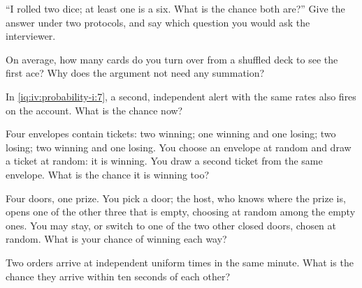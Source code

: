\begin{interviewq}\label{iq:iv:probability-i:8}
``I rolled two dice; at least one is a six. What is the chance both are?'' Give the answer under two protocols,
and say which question you would ask the interviewer.
\end{interviewq}

\begin{interviewq}\label{iq:iv:probability-i:9}
On average, how many cards do you turn over from a shuffled deck to see the first ace? Why does the argument
not need any summation?
\end{interviewq}

\begin{interviewq}\label{iq:iv:probability-i:10}
In \cref{iq:iv:probability-i:7}, a second, independent alert with the same rates also fires on the account.
What is the chance now?
\end{interviewq}

\begin{interviewq}\label{iq:iv:probability-i:11}
Four envelopes contain tickets: two winning; one winning and one losing; two losing; two winning and one losing.
You choose an envelope at random and draw a ticket at random: it is winning. You draw a second ticket from the
same envelope. What is the chance it is winning too?
\end{interviewq}

\begin{interviewq}\label{iq:iv:probability-i:12}
Four doors, one prize. You pick a door; the host, who knows where the prize is, opens one of the other three
that is empty, choosing at random among the empty ones. You may stay, or switch to one of the two other closed
doors, chosen at random. What is your chance of winning each way?
\end{interviewq}

\begin{interviewq}\label{iq:iv:probability-i:13}
Two orders arrive at independent uniform times in the same minute. What is the chance they arrive within ten
seconds of each other?
\end{interviewq}

